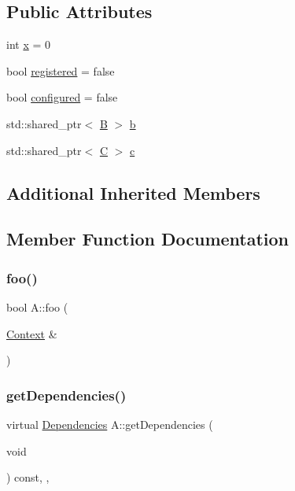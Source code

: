 \subsection*{Public Attributes}
\begin{DoxyCompactItemize}
\item 
int \mbox{\hyperlink{class_a_ac88449f5677bb5bf7923a9127979a200}{x}} = 0
\item 
bool \mbox{\hyperlink{class_a_abbe7bfef380b5ba2aa123bcc96cb0785}{registered}} = false
\item 
bool \mbox{\hyperlink{class_a_a56277b5454bbb3d64c068c3c86161a3f}{configured}} = false
\item 
std\+::shared\+\_\+ptr$<$ \mbox{\hyperlink{class_b}{B}} $>$ \mbox{\hyperlink{class_a_a8bd74753f3d363c7f249ef6d6b55bc31}{b}}
\item 
std\+::shared\+\_\+ptr$<$ \mbox{\hyperlink{class_c}{C}} $>$ \mbox{\hyperlink{class_a_aade577263852e9bb04be26d377f990da}{c}}
\end{DoxyCompactItemize}
\subsection*{Additional Inherited Members}


\subsection{Member Function Documentation}
\mbox{\label{class_a_a7cda350ed54b9810f6e1bfdb6c7189d6}} 
\subsubsection{\texorpdfstring{foo()}{foo()}}
{\footnotesize\ttfamily bool A\+::foo (\begin{DoxyParamCaption}\item[{\mbox{\hyperlink{classo_z_1_1_context}{Context}} \&}]{ }\end{DoxyParamCaption})\hspace{0.3cm}{\ttfamily [inline]}}

\mbox{\label{class_a_a2220cafae67f880a553d6219dfcf8581}} 
\subsubsection{\texorpdfstring{getDependencies()}{getDependencies()}}
{\footnotesize\ttfamily virtual \mbox{\hyperlink{classo_z_1_1_i_module_ac13210556cb2a65d186bfbe5208c666c}{Dependencies}} A\+::get\+Dependencies (\begin{DoxyParamCaption}\item[{void}]{ }\end{DoxyParamCaption}) const\hspace{0.3cm}{\ttfamily [inline]}, {\ttfamily [virtual]}, {\ttfamily [noexcept]}}



